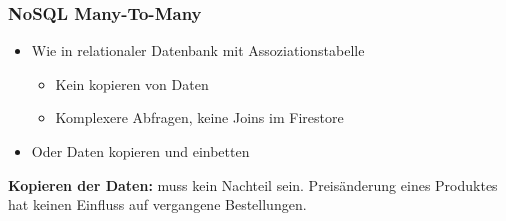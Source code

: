 \subsubsection{NoSQL Many-To-Many}
\begin{itemize}
    \item Wie in relationaler Datenbank mit Assoziationstabelle
    \begin{itemize}
        \item Kein kopieren von Daten
        \item Komplexere Abfragen, keine Joins im Firestore
    \end{itemize}
    \item Oder Daten kopieren und einbetten
\end{itemize}
\textbf{Kopieren der Daten:} muss kein Nachteil sein.
Preisänderung eines Produktes hat keinen Einfluss auf vergangene Bestellungen.